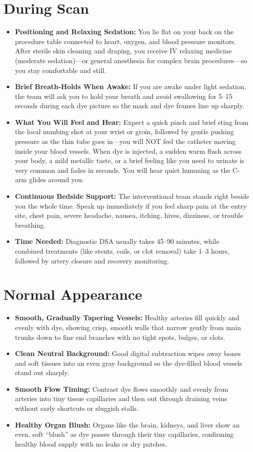 \section{During Scan}
\begin{itemize}
\item \textbf{Positioning and Relaxing Sedation:} You lie flat on your back on the procedure table connected to heart, oxygen, and blood pressure monitors. After sterile skin cleaning and draping, you receive IV relaxing medicine (moderate sedation)---or general anesthesia for complex brain procedures---so you stay comfortable and still.
\item \textbf{Brief Breath-Holds When Awake:} If you are awake under light sedation, the team will ask you to hold your breath and avoid swallowing for 5--15 seconds during each dye picture so the mask and dye frames line up sharply.
\item \textbf{What You Will Feel and Hear:} Expect a quick pinch and brief sting from the local numbing shot at your wrist or groin, followed by gentle pushing pressure as the thin tube goes in---you will NOT feel the catheter moving inside your blood vessels. When dye is injected, a sudden warm flush across your body, a mild metallic taste, or a brief feeling like you need to urinate is very common and fades in seconds. You will hear quiet humming as the C-arm glides around you.
\item \textbf{Continuous Bedside Support:} The interventional team stands right beside you the whole time. Speak up immediately if you feel sharp pain at the entry site, chest pain, severe headache, nausea, itching, hives, dizziness, or trouble breathing.
\item \textbf{Time Needed:} Diagnostic DSA usually takes 45--90 minutes, while combined treatments (like stents, coils, or clot removal) take 1--3 hours, followed by artery closure and recovery monitoring.
\end{itemize}

\section{Normal Appearance}
\begin{itemize}
\item \textbf{Smooth, Gradually Tapering Vessels:} Healthy arteries fill quickly and evenly with dye, showing crisp, smooth walls that narrow gently from main trunks down to fine end branches with no tight spots, bulges, or clots.
\item \textbf{Clean Neutral Background:} Good digital subtraction wipes away bones and soft tissues into an even gray background so the dye-filled blood vessels stand out sharply.
\item \textbf{Smooth Flow Timing:} Contrast dye flows smoothly and evenly from arteries into tiny tissue capillaries and then out through draining veins without early shortcuts or sluggish stalls.
\item \textbf{Healthy Organ Blush:} Organs like the brain, kidneys, and liver show an even, soft ``blush'' as dye passes through their tiny capillaries, confirming healthy blood supply with no leaks or dry patches.
\end{itemize}

